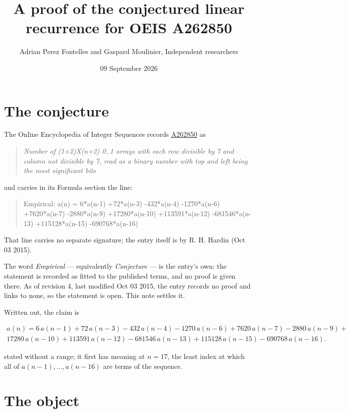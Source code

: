 \documentclass[11pt]{article}
\title{A proof of the conjectured linear recurrence for OEIS A262850}
\author{Adrian Perez Fontelles and Gaspard Moulinier, Independent researchers}
\date{09 September 2026}
\theoremstyle{definition}
\begin{document}
\maketitle
\section{The conjecture}

The Online Encyclopedia of Integer Sequences records \href{https://oeis.org/A262850}{A262850} as

\begin{quote}\itshape Number of (1+2)X(n+2) 0..1 arrays with each row divisible by 7 and column not divisible by 7, read as a binary number with top and left being the most significant bits\end{quote}

and carries in its Formula section the line:

\begin{quote}\ttfamily Empirical: a(n) = 6*a(n-1) +72*a(n-3) -432*a(n-4) -1270*a(n-6) +7620*a(n-7) -2880*a(n-9) +17280*a(n-10) +113591*a(n-12) -681546*a(n-13) +115128*a(n-15) -690768*a(n-16)\end{quote}

That line carries no separate signature; the entry itself is by R. H. Hardin (Oct 03 2015).

The word {\itshape Empirical} --- equivalently {\itshape Conjecture} --- is the entry's own: the statement is recorded as fitted to the published terms, and no proof is given there. As of revision 4, last modified Oct 03 2015, the entry records no proof and links to none, so the statement is open. This note settles it.

Written out, the claim is

\begin{multline*} a(n) = 6\,a(n-1) + 72\,a(n-3) - 432\,a(n-4) - 1270\,a(n-6) + 7620\,a(n-7) - 2880\,a(n-9) + \\ 17280\,a(n-10) + 113591\,a(n-12) - 681546\,a(n-13) + 115128\,a(n-15) - 690768\,a(n-16). \end{multline*}

stated without a range; it first has meaning at $n = 17$, the least index at which all of $a(n-1),\dots,a(n-16)$ are terms of the sequence.

\section{The object}
\end{document}
